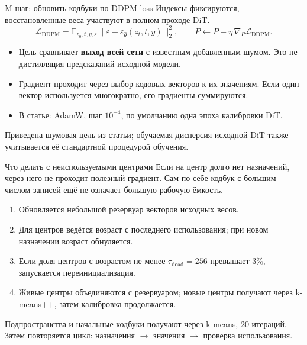 \documentclass[aspectratio=169,10pt]{beamer}
\newcommand{\takeaway}[1]{\par\vspace{1.5mm}{\bfseries #1\par}}
\newcommand{\smalltext}[1]{{\fontsize{10}{12}\selectfont #1\par}}
\newcommand{\tights}{\setlength{\itemsep}{1.4mm}\setlength{\parsep}{0pt}\setlength{\parskip}{0pt}}
\begin{document}
\begin{frame}[t]{M-шаг: обновить кодбуки по DDPM-loss}
  Индексы фиксируются, восстановленные веса участвуют в полном проходе DiT.
  \[
    \mathcal L_{\mathrm{DDPM}}=
      \mathbb E_{z_0,t,y,\varepsilon}
      \|\varepsilon-\varepsilon_{\widehat\theta}(z_t,t,y)\|_2^2,
    \qquad P\leftarrow P-\eta\,\nabla_P\mathcal L_{\mathrm{DDPM}}.
  \]
  \begin{itemize}\tights
    \item Цель сравнивает \textbf{выход всей сети} с известным добавленным шумом.
    Это не дистилляция предсказаний исходной модели.
    \item Градиент проходит через выбор кодовых векторов к их значениям.
    Если один вектор используется многократно, его градиенты суммируются.
    \item В статье: AdamW, шаг $10^{-4}$, по умолчанию одна эпоха калибровки DiT.
  \end{itemize}
  \smalltext{Приведена шумовая цель из статьи; обучаемая дисперсия исходной DiT
  также учитывается её стандартной процедурой обучения.}
  \takeaway{E-шаг меняет индексы перебором, M-шаг меняет значения градиентом.\par
  Это приближённое EM-чередование, не гарантия монотонного улучшения FID.}
\end{frame}

\begin{frame}[t]{Что делать с неиспользуемыми центрами}
  Если на центр долго нет назначений, через него не проходит полезный градиент.
  Сам по себе кодбук с большим числом записей ещё не означает большую рабочую ёмкость.
  \begin{enumerate}\tights
    \item Обновляется небольшой резервуар векторов исходных весов.
    \item Для центров ведётся возраст с последнего использования;
    при новом назначении возраст обнуляется.
    \item Если доля центров с возрастом не менее $\tau_{\mathrm{dead}}=256$
    превышает 3\%, запускается переинициализация.
    \item Живые центры объединяются с резервуаром;
    новые центры получают через k-means++, затем калибровка продолжается.
  \end{enumerate}
  \smalltext{Подпространства и начальные кодбуки получают через k-means, 20 итераций.
  Затем повторяется цикл: назначения $\to$ значения $\to$ проверка использования.}
  \takeaway{Это поддержание ёмкости кодбука при обучении,\par
  а не отдельные кодбуки для разных временных окон.}
\end{frame}
\end{document}
